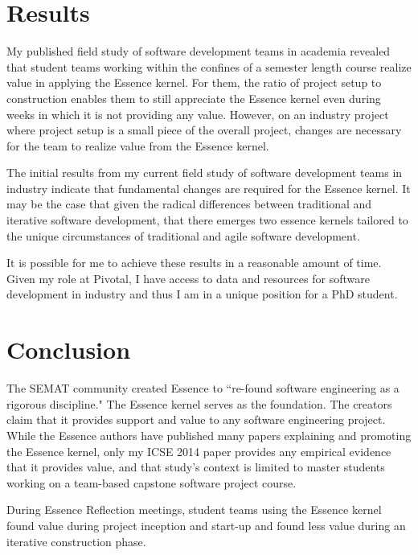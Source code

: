 \documentclass[preprint,12pt,3p]{elsarticle}
\begin{document}
\section{Results}

My published field study of software development teams in academia revealed that student teams working within the confines of a semester length course realize value in applying the Essence kernel. For them, the ratio of project setup to construction enables them to still appreciate the Essence kernel even during weeks in which it is not providing any value. However, on an industry project where project setup is a small piece of the overall project, changes are necessary for the team to realize value from the Essence kernel.

The initial results from my current field study of software development teams in industry indicate that fundamental changes are required for the Essence kernel. It may be the case that given the radical differences between traditional and iterative software development, that there emerges two essence kernels tailored to the unique circumstances of traditional and agile software development.

It is possible for me to achieve these results in a reasonable amount of time. 
Given my role at Pivotal, I have access to data and resources for software development in industry and thus I am in a unique position for a PhD student.  

\section{Conclusion}
\label{Conclusions}

The SEMAT community created Essence to ``re-found software engineering as a rigorous discipline." The Essence kernel serves as the foundation. The creators claim that it provides support and value to any software engineering project. While the Essence authors have published many papers explaining and promoting the Essence kernel, only my ICSE 2014 paper provides any empirical evidence that it provides value, and that study's context is limited to master students working on a team-based capstone software project course. 

During Essence Reflection meetings, student teams using the Essence kernel found value during project inception and start-up and found less value during an iterative construction phase. 
\end{document}

